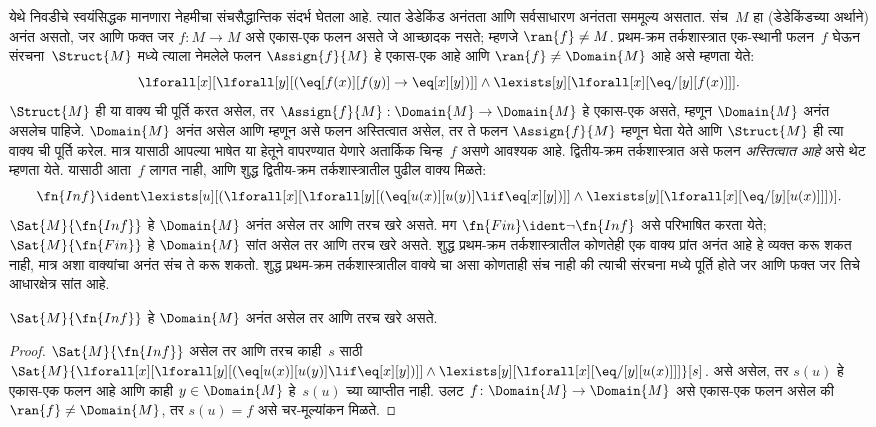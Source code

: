 येथे निवडीचे स्वयंसिद्धक मानणारा नेहमीचा
संचसैद्धान्तिक संदर्भ घेतला आहे. त्यात डेडेकिंड अनंतता
आणि सर्वसाधारण अनंतता सममूल्य असतात.
संच~$M$ हा
(डेडेकिंडच्या अर्थाने)
अनंत असतो,
जर आणि फक्त जर
$f\colon M
\to M$ असे
एकास-एक
फलन असते जे
आच्छादक
नसते; म्हणजे
$\ran{f} \neq M$.
प्रथम-क्रम
तर्कशास्त्रात
एक-स्थानी
फलन~$f$
घेऊन
संरचना~$\Struct{M}$
मध्ये त्याला
नेमलेले फलन
$\Assign{f}{M}$
हे एकास-एक
आहे आणि
$\ran{f} \neq
\Domain{M}$
आहे असे
म्हणता येते:
\[\lforall[x][\lforall[y][(\eq[f(x)][f(y)] \to \eq[x][y])]] \land
\lexists[y][\lforall[x][\eq/[y][f(x)]]].
\]
$\Struct{M}$
ही या
वाक्य
ची पूर्ति करत
असेल, तर
$\Assign{f}{M}:
\Domain{M} \to \Domain{M}$
हे एकास-एक
असते, म्हणून
$\Domain{M}$
अनंत असलेच
पाहिजे.
$\Domain{M}$
अनंत असेल
आणि म्हणून
असे फलन
अस्तित्वात असेल,
तर ते फलन
$\Assign{f}{M}$
म्हणून घेता
येते आणि
$\Struct{M}$
ही त्या
वाक्य
ची पूर्ति करेल.
मात्र यासाठी
आपल्या भाषेत
या हेतूने
वापरण्यात येणारे
अतार्किक चिन्ह~$f$
असणे आवश्यक
आहे.
द्वितीय-क्रम
तर्कशास्त्रात
असे फलन
\emph{अस्तित्वात आहे}
असे थेट
म्हणता येते.
यासाठी
आता~$f$
लागत नाही,
आणि शुद्ध
द्वितीय-क्रम
तर्कशास्त्रातील
पुढील
वाक्य
मिळते:
\[\fn{Inf} \ident \lexists[u][(\lforall[x][\lforall[y][(\eq[u(x)][u(y)]
      \lif \eq[x][y])]] \land \lexists[y][\lforall[x][\eq/[y][u(x)]]])].
\]
$\Sat{M}{\fn{Inf}}$
हे
$\Domain{M}$
अनंत असेल
तर आणि तरच
खरे असते.
मग
$\fn{Fin} \ident \lnot \fn{Inf}$
असे परिभाषित
करता येते;
$\Sat{M}{\fn{Fin}}$
हे
$\Domain{M}$
सांत असेल
तर आणि तरच
खरे असते.
शुद्ध प्रथम-क्रम
तर्कशास्त्रातील
कोणतेही एक
वाक्य
प्रांत
अनंत आहे
हे व्यक्त
करू शकत
नाही, मात्र
अशा वाक्यांचा
अनंत संच
ते करू शकतो.
शुद्ध प्रथम-क्रम
तर्कशास्त्रातील
वाक्ये
चा असा
कोणताही संच
नाही की
त्याची
संरचना
मध्ये पूर्ति
होते जर आणि
फक्त जर तिचे
आधारक्षेत्र
सांत आहे.

\begin{prop}
$\Sat{M}{\fn{Inf}}$
हे
$\Domain{M}$
अनंत असेल
तर आणि तरच
खरे असते.
\end{prop}

\begin{proof}
$\Sat{M}{\fn{Inf}}$
असेल तर आणि
तरच काही~$s$
साठी
  $\Sat{M}{\lforall[x][\lforall[y][(\eq[u(x)][u(y)] \lif \eq[x][y])]]
    \land \lexists[y][\lforall[x][\eq/[y][u(x)]]]}[s]$.
  असे असेल,
  तर $s(u)$
  हे एकास-एक
  फलन आहे
  आणि काही
  $y
  \in \Domain{M}$
  हे~$s(u)$
  च्या व्याप्तीत
  नाही.
  उलट
  $f\colon \Domain{M} \to \Domain{M}$
  असे
  एकास-एक
  फलन असेल
  की
  $\ran{f}
  \neq \Domain{M}$,
  तर
  $s(u) = f$
  असे चर-मूल्यांकन
  मिळते.
\end{proof}

